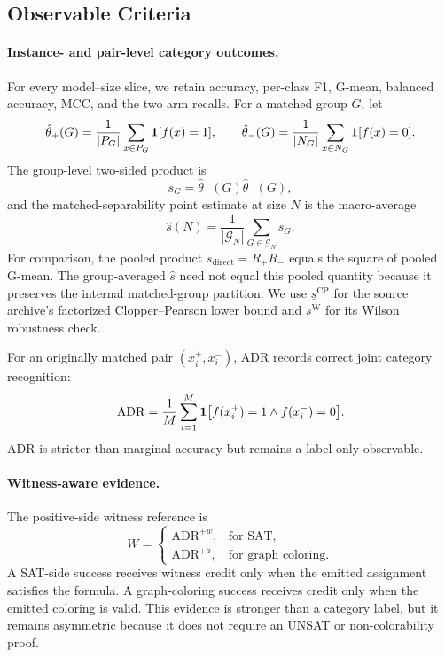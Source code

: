 \documentclass[acmsmall,screen,review,anonymous]{acmart}
\providecommand{\ADR}{\mathrm{ADR}}
\providecommand{\ADRw}{\mathrm{ADR}^{+w}}
\providecommand{\ADRa}{\mathrm{ADR}^{+a}}
\providecommand{\WitnessRate}{W}
\providecommand{\SepPoint}{\widehat{s}}
\providecommand{\SepCP}{\underline{s}^{\mathrm{CP}}}
\providecommand{\SepWilson}{\underline{s}^{\mathrm{W}}}
\newcounter{experiment}
\begin{document}
\subsection{Observable Criteria}
\label{sec:experimental-observables}

\paragraph{Instance- and pair-level category outcomes.}
For every model--size slice, we retain accuracy, per-class
F1, G-mean, balanced accuracy, MCC, and the two arm recalls. For a matched
group \(G\), let
\[
\hat{\theta}_{+}(G)
=
\frac{1}{|P_G|}
\sum_{x\in P_G}\mathbf{1}[f(x)=1],
\qquad
\hat{\theta}_{-}(G)
=
\frac{1}{|N_G|}
\sum_{x\in N_G}\mathbf{1}[f(x)=0].
\]
The group-level two-sided product is
\[
s_G=\hat{\theta}_{+}(G)\hat{\theta}_{-}(G),
\]
and the matched-separability point estimate at size \(N\) is the macro-average
\[
\SepPoint(N)
=
\frac{1}{|\mathcal{G}_N|}
\sum_{G\in\mathcal{G}_N}s_G.
\]
For comparison, the pooled product
\(s_{\mathrm{direct}}=R_{+}R_{-}\) equals the square of pooled G-mean.
The group-averaged \(\SepPoint\) need not equal this pooled quantity because it
preserves the internal matched-group partition. We use \(\SepCP\) for the
source archive's factorized Clopper--Pearson lower bound and
\(\SepWilson\) for its Wilson robustness check.

For an originally matched pair \((x_i^{+},x_i^{-})\), ADR records correct
joint category recognition:
\[
\ADR
=
\frac{1}{M}
\sum_{i=1}^{M}
\mathbf{1}
\bigl[
\model(x_i^{+})=1
\land
\model(x_i^{-})=0
\bigr].
\]
ADR is stricter than marginal accuracy but remains a label-only observable.

\paragraph{Witness-aware evidence.}
The positive-side witness reference is
\[
\WitnessRate
=
\begin{cases}
\ADRw, & \text{for SAT,}\\
\ADRa, & \text{for graph coloring.}
\end{cases}
\]
A SAT-side success receives witness credit only when the emitted assignment
satisfies the formula. A graph-coloring success receives credit only when the
emitted coloring is valid. This evidence is stronger than a category label,
but it remains asymmetric because it does not require an UNSAT or
non-colorability proof.
\end{document}
